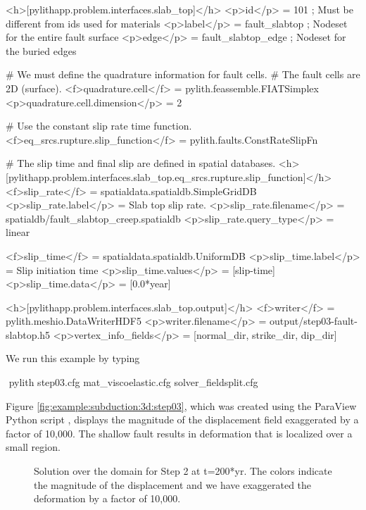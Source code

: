 \begin{cfg}
<h>[pylithapp.problem.interfaces.slab_top]</h>
<p>id</p> = 101 ; Must be different from ids used for materials
<p>label</p> = fault_slabtop ; Nodeset for the entire fault surface
<p>edge</p> = fault_slabtop_edge ; Nodeset for the buried edges

# We must define the quadrature information for fault cells.
# The fault cells are 2D (surface).
<f>quadrature.cell</f> = pylith.feassemble.FIATSimplex
<p>quadrature.cell.dimension</p> = 2

# Use the constant slip rate time function.
<f>eq_srcs.rupture.slip_function</f> = pylith.faults.ConstRateSlipFn

# The slip time and final slip are defined in spatial databases.
<h>[pylithapp.problem.interfaces.slab_top.eq_srcs.rupture.slip_function]</h>
<f>slip_rate</f> = spatialdata.spatialdb.SimpleGridDB
<p>slip_rate.label</p> = Slab top slip rate.
<p>slip_rate.filename</p> = spatialdb/fault_slabtop_creep.spatialdb
<p>slip_rate.query_type</p> = linear

<f>slip_time</f> = spatialdata.spatialdb.UniformDB
<p>slip_time.label</p>  = Slip initiation time
<p>slip_time.values</p> = [slip-time]
<p>slip_time.data</p> = [0.0*year]

<h>[pylithapp.problem.interfaces.slab_top.output]</h>
<f>writer</f> = pylith.meshio.DataWriterHDF5
<p>writer.filename</p> = output/step03-fault-slabtop.h5
<p>vertex_info_fields</p> = [normal_dir, strike_dir, dip_dir]
\end{cfg}

We run this example by typing
\begin{shell}
$$ pylith step03.cfg mat_viscoelastic.cfg solver_fieldsplit.cfg
\end{shell}

Figure \vref{fig:example:subduction:3d:step03}, which was created
using the ParaView Python script , displays
the magnitude of the displacement field exaggerated by a factor of 10,000.
The shallow fault results in deformation that is localized over a
small region.

\begin{figure}
  \caption{Solution over the domain for Step 2 at t=200*yr. The colors indicate
    the magnitude of the displacement and we have exaggerated the
    deformation by a factor of 10,000.}
  \label{fig:example:subduction:3d:step02}
\end{figure}


